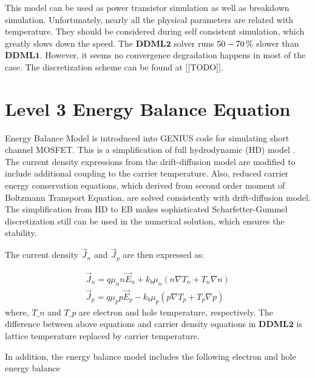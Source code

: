 \documentclass[oneside,12pt]{cgd_book}
\begin{document}
This model can be used as power transistor simulation as well as breakdown simulation. Unfortunately, nearly
      all the physical parameters are related with temperature. They should be considered during self consistent
      simulation, which greatly slows down the speed. The $\mathbf{DDML2}$
solver runs $50-70\text{\,\%}$ slower than $\mathbf{DDML1}$. However, it seems no convergence
      degradation happens in most of the case. The discretization scheme can be found at [[TODO]].
\par
\section{Level 3 Energy Balance Equation}
\label{sec:Equation:EBML3}
Energy Balance Model \cite[PISCES-2ET]{}
is introduced into GENIUS code for simulating
      short channel MOSFET. This is a simplification of full hydrodynamic (HD) model
\cite[Aste2003]{}. The
      current density expressions from the drift-diffusion model are modified to include additional coupling to the
      carrier temperature. Also, reduced carrier energy conservation equations, which derived from second order moment
      of Boltzmann Transport Equation, are solved consistently with drift-diffusion model. The simplification from HD to
      EB makes sophisticated Scharfetter-Gummel discretization still can be used in the numerical solution, which
      ensures the stability.
\par
{}The current density
$\vec{J}_n$ and $\vec{J}_p$ are then expressed as:
\par
\par
\begin{subequations}
\begin{align}
 \vec{J}_n  = q\mu_n n \vec{E}_n + k_b \mu_n \left( {n\nabla T_n + T_n \nabla n} \right)  \\
 \vec{J}_p  = q\mu_p p \vec{E}_p - k_b \mu_p \left( {p\nabla T_p + T_p \nabla p} \right)
\end{align}
\end{subequations}
where, $T\_n$ and $T\_p$ are electron and hole temperature, respectively. The difference between above
      equations and carrier density equations in $\mathbf{DDML2}$
is lattice temperature replaced by carrier
      temperature.
\par
{}In addition, the energy balance model includes the following electron and hole energy balance
\end{document}
